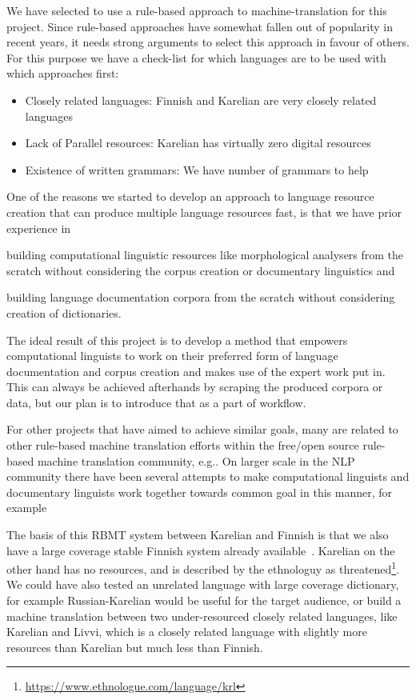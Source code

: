 \documentclass[11pt]{article}
\begin{document}
We have selected to use a rule-based approach to machine-translation for this
project. Since rule-based approaches have somewhat fallen out of popularity in
recent years, it needs strong arguments to select this approach in favour of
others. For this purpose we have a check-list for which languages are to be used
with which approaches first:

\begin{itemize}
    \item Closely related languages: Finnish and Karelian are very closely
        related languages
    \item Lack of Parallel resources: Karelian has virtually zero
        digital resources
    \item Existence of written grammars: We have number of grammars to
        help~\cite{zaikov2013vienankarjalan}
\end{itemize}

One of the reasons we started to develop an approach to language resource
creation that can produce multiple language resources fast, is that we have
prior experience in \begin{enumerate*}
    \item building computational linguistic resources like
morphological analysers from the scratch without considering the corpus creation
or documentary linguistics and
    \item building language documentation corpora from
        the scratch without considering creation of dictionaries.
\end{enumerate*}
The ideal result of this project is to develop a method that empowers
computational linguists to work on their preferred form of language
documentation and corpus creation and makes use of the expert work put in. This
can always be achieved afterhands by scraping the produced corpora or data, but
our plan is to introduce that as a part of workflow.

For other projects that have aimed to achieve similar goals, many are related
to other rule-based machine translation efforts within the free/open source
rule-based machine translation community, e.g.\cite{washington2014finite}.
On larger scale in the NLP community there have been several attempts to
make computational linguists and documentary linguists work together towards
common goal in this manner, for
example~\cite{maxwell2008joint,blokland2015language}

The basis of this RBMT system between Karelian and Finnish is that we also have
a large coverage stable Finnish system already available~\cite{omorfi}.
Karelian on the other hand has no resources, and is described by the ethnologuy
as threatened\footnote{\url{https://www.ethnologue.com/language/krl}}.  We
could have also tested an unrelated language with large coverage dictionary,
for example Russian-Karelian  would be useful for the target audience, or build
a machine translation between two under-resourced closely related languages,
like Karelian and Livvi, which is a closely related language with slightly
more resources than Karelian but much less than Finnish.
\end{document}

